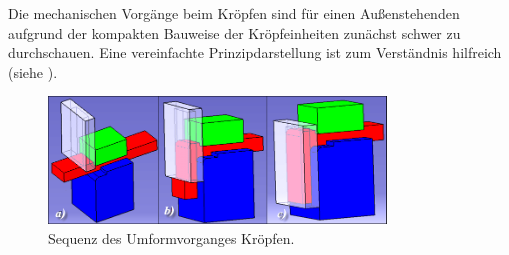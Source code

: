 \documentclass[12pt,a4paper,parskip,twoside,BCOR5mm,headsepline]{scrartcl}
\begin{document}
\begin{description*}
Die mechanischen Vorgänge beim Kröpfen sind für einen Außenstehenden aufgrund der kompakten Bauweise der Kröpfeinheiten zunächst schwer zu durchschauen. Eine  vereinfachte Prinzipdarstellung ist zum Verständnis  hilfreich (siehe ).\\
\begin{figure}[hbtp]
\centering
\includegraphics[width=0.8\textwidth]{krpfsequenz}
\caption{Sequenz des Umformvorganges Kröpfen.}
\label{fig:krpfprinz}
\end{figure}






\end{description*}
\end{document}
